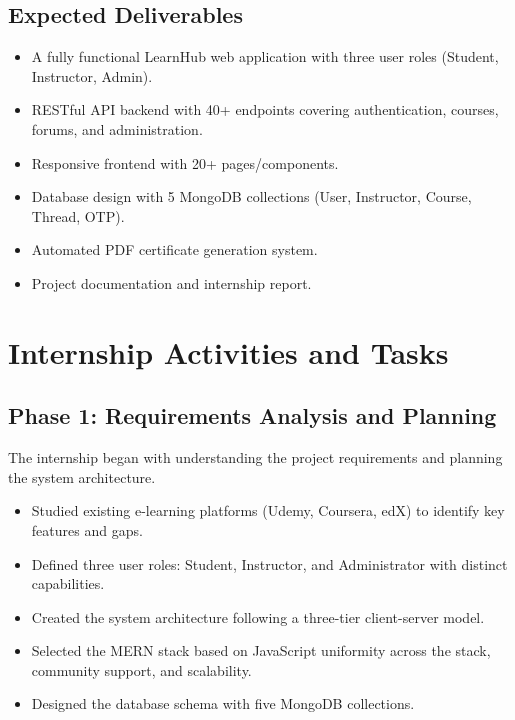 \documentclass[12pt,a4paper]{report}
\begin{document}
\section{Expected Deliverables}
\begin{itemize}
    \item A fully functional LearnHub web application with three user roles (Student, Instructor, Admin).
    \item RESTful API backend with 40+ endpoints covering authentication, courses, forums, and administration.
    \item Responsive frontend with 20+ pages/components.
    \item Database design with 5 MongoDB collections (User, Instructor, Course, Thread, OTP).
    \item Automated PDF certificate generation system.
    \item Project documentation and internship report.
\end{itemize}


\chapter{Internship Activities and Tasks}

\section{Phase 1: Requirements Analysis and Planning}
The internship began with understanding the project requirements and planning the system architecture.
\begin{itemize}
    \item Studied existing e-learning platforms (Udemy, Coursera, edX) to identify key features and gaps.
    \item Defined three user roles: Student, Instructor, and Administrator with distinct capabilities.
    \item Created the system architecture following a three-tier client-server model.
    \item Selected the MERN stack based on JavaScript uniformity across the stack, community support, and scalability.
    \item Designed the database schema with five MongoDB collections.
\end{itemize}
\end{document}
